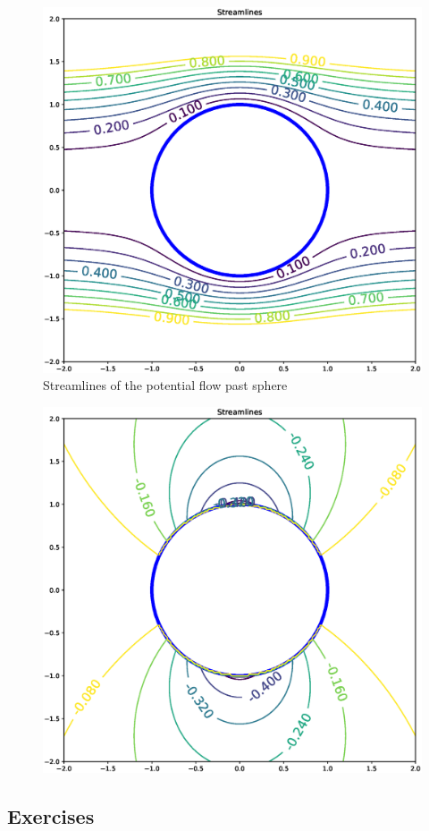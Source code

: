 \begin{figure}
  \centering
  \includegraphics[width=0.4\linewidth]{figures/potential_flow_past_sphere}
  \caption{\label{fig:potential_streamlines_sphere} Streamlines of
    the potential flow past sphere}
\end{figure}



\begin{figure}
  \centering
  \includegraphics[width=0.4\linewidth]{figures/potential_flow_past_sphere_moving}
  \caption{\label{fig:potential_streamlines_moving_sphere}}
\end{figure}


\subsection{Exercises}

